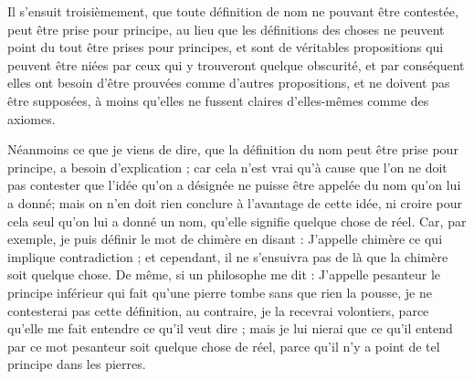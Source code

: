 Il s'ensuit troisièmement, que toute définition de nom ne pouvant être contestée, peut être prise pour principe, au lieu que les définitions des choses ne peuvent point du tout être prises pour principes, et sont de véritables propositions qui peuvent être niées par ceux qui y trouveront quelque obscurité, et par conséquent elles ont besoin d'être prouvées comme d'autres propositions, et ne doivent pas être supposées, à moins qu'elles ne fussent claires d'elles-mêmes comme des axiomes.

Néanmoins ce que je viens de dire, que la définition du nom peut être prise pour principe, a besoin d'explication ; car cela n'est vrai qu'à cause que l'on ne doit pas contester que l'idée qu'on a désignée ne puisse être appelée du nom qu'on lui a donné; mais on n'en doit rien conclure à l'avantage de cette idée, ni croire pour cela seul qu'on lui a donné un nom, qu'elle signifie quelque chose de réel. Car, par exemple, je puis définir le mot de chimère en disant : J'appelle chimère ce qui implique contradiction ; et cependant, il ne s'ensuivra pas de là que la chimère soit quelque chose. De même, si un philosophe me dit : J'appelle pesanteur le principe inférieur qui fait qu'une pierre tombe sans que rien la pousse, je ne contesterai pas cette définition, au contraire, je la recevrai volontiers, parce qu'elle me fait entendre ce qu'il veut dire ; mais je lui nierai que ce qu'il entend par ce mot pesanteur soit quelque chose de réel, parce qu'il n'y a point de tel principe dans les pierres.

